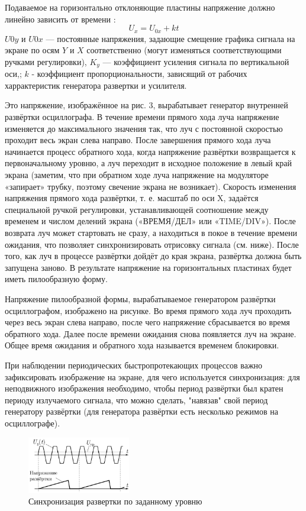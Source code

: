 \documentclass[a4paper]{article}
\begin{document}
Подаваемое на горизонтально отклоняющие пластины напряжение должно линейно зависить от времени : 
\[U_x = U_{0x}+ kt\]
$U0y$ и $U0x$ — постоянные напряжения, задающие смещение графика сигнала на экране по осям $Y$ и $X$ соответственно (могут изменяться соответствующими ручками регулировки), $K_{y}$ — коэффициент усиления сигнала по вертикальной оси,; $k$ - коэффициент пропорциональности, зависящий от рабочих харрактеристик генератора развертки и усилителя.

Это напряжение, изображённое на рис. 3, вырабатывает генератор внутренней развёртки осциллографа. В течение времени прямого хода луча напряжение изменяется до максимального значения так, что луч с постоянной скоростью проходит весь экран слева направо. После завершения прямого хода луча начинается процесс обратного хода, когда напряжение развёртки возвращается к первоначальному уровню, а луч переходит в исходное положение в левый край экрана (заметим, что при обратном ходе луча напряжение на модуляторе «запирает» трубку, поэтому свечение экрана не возникает). Скорость изменения напряжения прямого хода развёртки, т. е. масштаб по оси X, задаётся специальной ручкой регулировки, устанавливающей соотношение между временем и числом делений экрана («ВРЕМЯ/ДЕЛ» или «TIME/DIV»). После возврата луч может стартовать не сразу, а находиться в покое в течение времени ожидания, что позволяет синхронизировать отрисовку сигнала (см. ниже). После того, как луч в процессе развёртки дойдёт до края экрана, развёртка должна быть запущена заново. В результате напряжение на горизонтальных пластинах будет иметь пилообразную форму. 

Напряжение пилообразной формы, вырабатываемое генератором развёртки осциллографом, изображено на рисунке. Во время прямого хода луч проходить через весь экран слева направо, после чего напряжение сбрасывается во время обратного хода. Далее после времени ожидания снова появляется луч на экране. Общее время ожидания и обратного хода называется временем блокировки.

При наблюдении периодических быстропротекающих процессов важно зафиксировать изображение на экране, для чего используется синхронизация: для неподвижного изображения необходимо, чтобы период развёртки был кратен периоду излучаемого сигнала, что можно сделать, "навязав" свой период генератору развёртки (для генератора развёртки есть несколько режимов на осциллографе).

\begin{figure}
\centering
\includegraphics[width=0.4\textwidth]{4.png}
\caption{Синхронизация развертки по заданному уровню}
\end{figure}
\end{document}

